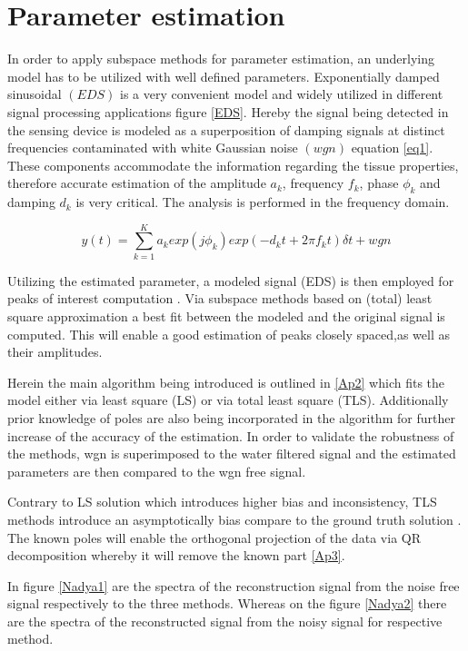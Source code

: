 \section{Parameter estimation}\label{sec2}

In order to apply subspace methods for parameter estimation, an underlying model has to be utilized with well defined parameters. Exponentially damped sinusoidal $(EDS)$ is a very convenient model and widely utilized in different signal processing applications figure \ref{EDS}. Hereby the signal being detected in the sensing device is modeled as a superposition of damping signals at distinct frequencies contaminated with white Gaussian noise $(wgn)$ equation \ref{eq1}. These components accommodate the information regarding the tissue properties, therefore accurate estimation of the amplitude $a_{k}$, frequency $f_{k}$, phase $\phi_{k}$ and damping $d_{k}$ is very critical. The analysis is performed in the frequency domain.   

 
\begin{equation}\label{eq1}
y(t)=\sum_{k=1}^{K} a_{k}exp(j\phi_{k})exp(-d_{k}t+2\pi f_{k}t)\delta t+wgn
\end{equation}

Utilizing the estimated parameter, a modeled signal (EDS) is then employed for peaks of interest computation . Via subspace methods based on (total) least square approximation a best fit between the modeled and the original signal is computed. This will enable a good estimation of peaks closely spaced,as well as their amplitudes. 

Herein the main algorithm being introduced is outlined in \ref{Ap2} which fits the model either via least square (LS) or via total least square (TLS). Additionally prior knowledge of poles are also being incorporated in the algorithm for further increase of the accuracy of the estimation. In order to validate the robustness of the methods, wgn is superimposed to the water filtered signal and the estimated parameters are then compared to the wgn free signal. 


Contrary to LS solution which introduces higher bias and inconsistency, TLS methods introduce an asymptotically bias compare to the ground truth solution \cite{7}. The known poles will enable the orthogonal projection of the data via QR decomposition whereby it will remove the known part \ref{Ap3}. 

In figure \ref{Nadya1} are the spectra of the reconstruction signal from the noise free signal respectively to the three methods. Whereas on the figure \ref{Nadya2} there are the spectra of the reconstructed signal from the noisy signal for respective method. 

